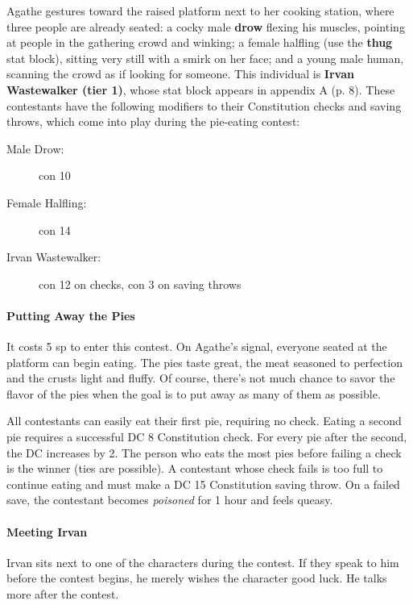 \documentclass[letterpaper, 11pt, bg=full, twocolumn]{dndbook}
\begin{document}
Agathe gestures toward the raised platform next to her cooking station, where three people are already seated: a cocky male \textbf{drow} flexing his muscles, pointing at people in the gathering crowd and winking; a female halfling (use the \textbf{thug} stat block), sitting very still with a smirk on her face; and a young male human, scanning the crowd as if looking for someone. This individual is \textbf{Irvan Wastewalker (tier 1)}, whose stat block appears in appendix A (p. 8). These contestants have the following modifiers to their Constitution checks and saving throws, which come into play during the pie-eating contest:

\begin{description}
\item[Male Drow:] con 10
\item[Female Halfling:] con 14
\item[Irvan Wastewalker:] con 12 on checks, con 3 on saving throws
\end{description}

\paragraph{Putting Away the Pies}

It costs 5 sp to enter this contest. On Agathe's signal, everyone seated at the platform can begin eating. The pies taste great, the meat seasoned to perfection and the crusts light and fluffy. Of course, there's not much chance to savor the flavor of the pies when the goal is to put away as many of them as possible.

All contestants can easily eat their first pie, requiring no check. Eating a second pie requires a successful DC 8 Constitution check. For every pie after the second, the DC increases by 2. The person who eats the most pies before failing a check is the winner (ties are possible). A contestant whose check fails is too full to continue eating and must make a DC 15 Constitution saving throw. On a failed save, the contestant becomes \textit{poisoned} for 1 hour and feels queasy.

\paragraph{Meeting Irvan}

Irvan sits next to one of the characters during the contest. If they speak to him before the contest begins, he merely wishes the character good luck. He talks more after the contest.
\end{document}
